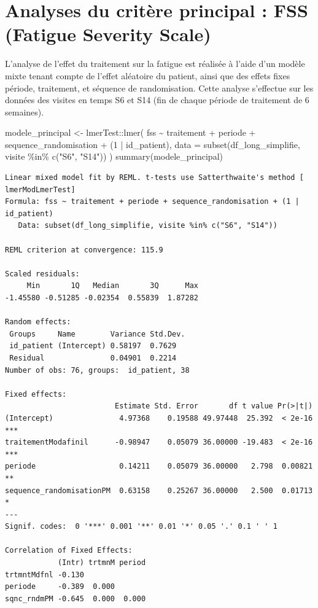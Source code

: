 \documentclass[
  letterpaper,
  DIV=11,
  numbers=noendperiod]{scrartcl}
\newenvironment{Shaded}{\begin{snugshade}}{\end{snugshade}}
\newcommand{\AttributeTok}[1]{\textcolor[rgb]{0.40,0.45,0.13}{#1}}
\newcommand{\DecValTok}[1]{\textcolor[rgb]{0.68,0.00,0.00}{#1}}
\newcommand{\FunctionTok}[1]{\textcolor[rgb]{0.28,0.35,0.67}{#1}}
\newcommand{\NormalTok}[1]{\textcolor[rgb]{0.00,0.23,0.31}{#1}}
\newcommand{\OtherTok}[1]{\textcolor[rgb]{0.00,0.23,0.31}{#1}}
\newcommand{\SpecialCharTok}[1]{\textcolor[rgb]{0.37,0.37,0.37}{#1}}
\newcommand{\StringTok}[1]{\textcolor[rgb]{0.13,0.47,0.30}{#1}}
\begin{document}
\section{Analyses du critère principal : FSS (Fatigue Severity
Scale)}\label{analyses-du-crituxe8re-principal-fss-fatigue-severity-scale}

L'analyse de l'effet du traitement sur la fatigue est réalisée à l'aide
d'un modèle mixte tenant compte de l'effet aléatoire du patient, ainsi
que des effets fixes période, traitement, et séquence de randomisation.
Cette analyse s'effectue sur les données des visites en temps S6 et S14
(fin de chaque période de traitement de 6 semaines).

\begin{Shaded}
\begin{Highlighting}[]
\NormalTok{modele\_principal }\OtherTok{\textless{}{-}}\NormalTok{ lmerTest}\SpecialCharTok{::}\FunctionTok{lmer}\NormalTok{(}
\NormalTok{  fss }\SpecialCharTok{\textasciitilde{}}\NormalTok{ traitement }\SpecialCharTok{+}\NormalTok{ periode }\SpecialCharTok{+}\NormalTok{ sequence\_randomisation }\SpecialCharTok{+}\NormalTok{ (}\DecValTok{1} \SpecialCharTok{|}\NormalTok{ id\_patient),}
  \AttributeTok{data =} \FunctionTok{subset}\NormalTok{(df\_long\_simplifie, visite }\SpecialCharTok{\%in\%} \FunctionTok{c}\NormalTok{(}\StringTok{"S6"}\NormalTok{, }\StringTok{"S14"}\NormalTok{))}
\NormalTok{)}
\FunctionTok{summary}\NormalTok{(modele\_principal)}
\end{Highlighting}
\end{Shaded}

\begin{verbatim}
Linear mixed model fit by REML. t-tests use Satterthwaite's method [
lmerModLmerTest]
Formula: fss ~ traitement + periode + sequence_randomisation + (1 | id_patient)
   Data: subset(df_long_simplifie, visite %in% c("S6", "S14"))

REML criterion at convergence: 115.9

Scaled residuals: 
     Min       1Q   Median       3Q      Max 
-1.45580 -0.51285 -0.02354  0.55839  1.87282 

Random effects:
 Groups     Name        Variance Std.Dev.
 id_patient (Intercept) 0.58197  0.7629  
 Residual               0.04901  0.2214  
Number of obs: 76, groups:  id_patient, 38

Fixed effects:
                         Estimate Std. Error       df t value Pr(>|t|)    
(Intercept)               4.97368    0.19588 49.97448  25.392  < 2e-16 ***
traitementModafinil      -0.98947    0.05079 36.00000 -19.483  < 2e-16 ***
periode                   0.14211    0.05079 36.00000   2.798  0.00821 ** 
sequence_randomisationPM  0.63158    0.25267 36.00000   2.500  0.01713 *  
---
Signif. codes:  0 '***' 0.001 '**' 0.01 '*' 0.05 '.' 0.1 ' ' 1

Correlation of Fixed Effects:
            (Intr) trtmnM period
trtmntMdfnl -0.130              
periode     -0.389  0.000       
sqnc_rndmPM -0.645  0.000  0.000
\end{verbatim}
\end{document}
